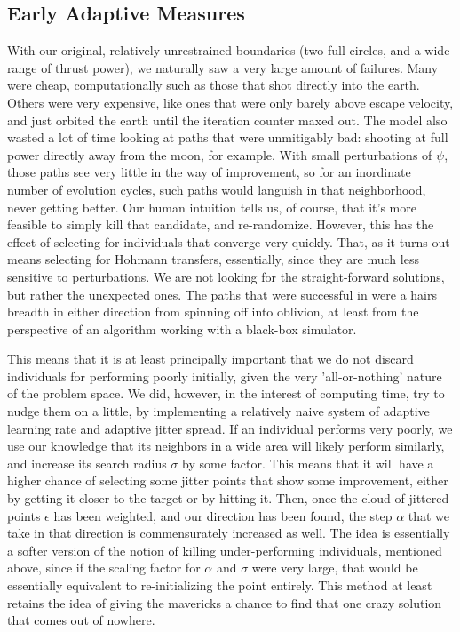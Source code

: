 \subsection{Early Adaptive Measures}
With our original, relatively unrestrained boundaries (two full circles, and a wide range of thrust power), we naturally saw a very large amount of failures. Many were cheap, computationally such as those that shot directly into the earth. Others were very expensive, like ones that were only barely above escape velocity, and just orbited the earth until the iteration counter maxed out. The model also wasted a lot of time looking at paths that were unmitigably bad: shooting at full power directly away from the moon, for example. With small perturbations of $\psi$, those paths see very little in the way of improvement, so for an inordinate number of evolution cycles, such paths would languish in that neighborhood, never getting better. Our human intuition tells us, of course, that it's more feasible to simply kill that candidate, and re-randomize. However, this has the effect of selecting for individuals that converge very quickly. That, as it turns out means selecting for Hohmann transfers, essentially, since they are much less sensitive to perturbations. We are not looking for the straight-forward solutions, but rather the unexpected ones. The paths that were successful in \cite{Saxe2015} were a hairs breadth in either direction from spinning off into oblivion, at least from the perspective of an algorithm working with a black-box simulator. 

This means that it is at least principally important that we do not discard individuals for performing poorly initially, given the very 'all-or-nothing' nature of the problem space. We did, however, in the interest of computing time, try to nudge them on a little, by implementing a relatively naive system of adaptive learning rate and adaptive jitter spread. If an individual performs very poorly, we use our knowledge that its neighbors in a wide area will likely perform similarly, and increase its search radius $\sigma$ by some factor. This means that it will have a higher chance of selecting some jitter points that show some improvement, either by getting it closer to the target or by hitting it. Then, once the cloud of jittered points $\epsilon$ has been weighted, and our direction has been found, the step $\alpha$ that we take in that direction is commensurately increased as well. The idea is essentially a softer version of the notion of killing under-performing individuals, mentioned above, since if the scaling factor for $\alpha$ and $\sigma$ were very large, that would be essentially equivalent to re-initializing the point entirely. This method at least retains the idea of giving the mavericks a chance to find that one crazy solution that comes out of nowhere.

